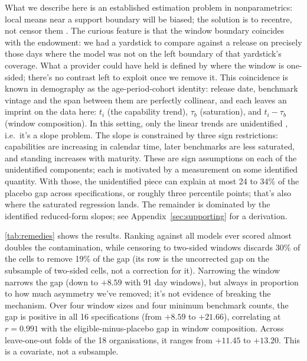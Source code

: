 What we describe here is an established estimation problem in nonparametrics: local means near a support boundary will be biased; the solution is to recentre, not censor them \citep{gasser1979,fan1992}. The curious feature is that the window boundary coincides with the endowment: we had a yardstick to compare against a release on precisely those days where the model was not on the left boundary of that yardstick's coverage. What a provider could have held is defined by where the window is one-sided; there's no contrast left to exploit once we remove it. This coincidence is known in demography as the age-period-cohort identity: release date, benchmark vintage and the span between them are perfectly collinear, and each leaves an imprint on the data here: $t_i$ (the capability trend), $\tau_b$ (saturation), and $t_i - \tau_b$ (window composition). In this setting, only the linear trends are unidentified \citep{fosse2019bounding,fosse2019review}, i.e.\ it's a slope problem. The slope is constrained by three sign restrictions: capabilities are increasing in calendar time, later benchmarks are less saturated, and standing increases with maturity. These are sign assumptions on each of the unidentified components; each is motivated by a measurement on some identified quantity. With those, the unidentified piece can explain at most 24 to 34\% of the placebo gap across specifications, or roughly three percentile points; that's also where the saturated regression lands. The remainder is dominated by the identified reduced-form slopes; see Appendix~\ref{sec:supporting} for a derivation.



\autoref{tab:remedies} shows the results. Ranking against all models ever scored almost doubles the contamination, while censoring to two-sided windows discards 30\% of the cells to remove 19\% of the gap (its row is the uncorrected gap on the subsample of two-sided cells, not a correction for it). Narrowing the window narrows the gap (down to $+8.59$ with 91 day windows), but always in proportion to how much asymmetry we've removed; it's not evidence of breaking the mechanism. Over four window sizes and four minimum benchmark counts, the gap is positive in all 16 specifications (from $+8.59$ to $+21.66$), correlating at $r = 0.991$ with the eligible-minus-placebo gap in window composition. Across leave-one-out folds of the 18 organisations, it ranges from $+11.45$ to $+13.20$. This is a covariate, not a subsample.

